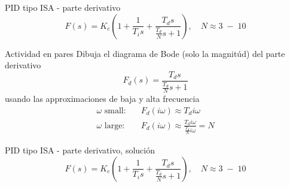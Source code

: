 \documentclass[presentation,aspectratio=1610]{beamer}
\begin{document}
\begin{frame}[label={sec:orga06296a}]{PID tipo ISA - parte derivativo}
\[ F(s) = K_c\left( 1 + \frac{1}{T_i s} + \frac{T_d s}{\frac{T_d}{N} s + 1}\right), \quad N \approx 3\; - \; 10 \]

\alert{Actividad en pares} Dibuja el diagrama de Bode (solo la magnitúd)  del parte derivativo \[F_d(s) = \frac{T_d s}{\frac{T_d}{N} s + 1}\] usando las approximaciones de baja y alta frecuencia
\begin{align*}
 \text{$\omega$ small:} \quad & F_d(i\omega) \approx T_d i\omega \\
 \text{$\omega$ large:} \quad & F_d(i\omega) \approx \frac{T_d i \omega }{\frac{T_d}{N} i\omega} = N
\end{align*}
\end{frame}

\begin{frame}[label={sec:org978e098}]{PID tipo ISA - parte derivativo, solución}
\[ F(s) = K_c\left( 1 + \frac{1}{T_i s} + \frac{T_d s}{\frac{T_d}{N} s + 1}\right), \quad N \approx 3\; - \; 10 \]

\begin{center}
  \def\Td{1}
  \def\NN{6}
\end{center}
\end{frame}
\end{document}
